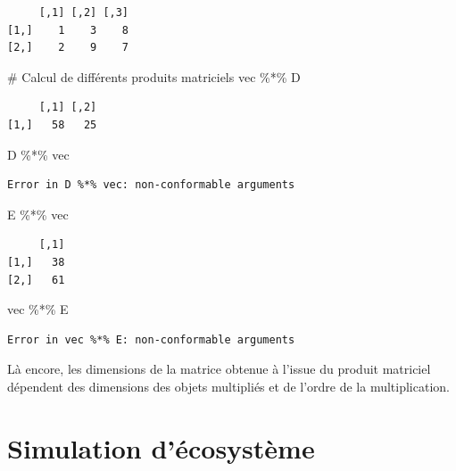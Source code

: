 \documentclass[
  french,
  a4paper,
  DIV=11,
  numbers=noendperiod,
  oneside]{scrreprt}
\newenvironment{Shaded}{}{}
\newcommand{\CommentTok}[1]{\textcolor[rgb]{0.42,0.45,0.49}{#1}}
\newcommand{\NormalTok}[1]{\textcolor[rgb]{0.14,0.16,0.18}{#1}}
\newcommand{\SpecialCharTok}[1]{\textcolor[rgb]{0.00,0.36,0.77}{#1}}
\begin{document}
\begin{tcolorbox}
\begin{verbatim}
     [,1] [,2] [,3]
[1,]    1    3    8
[2,]    2    9    7
\end{verbatim}

\begin{Shaded}
\begin{Highlighting}[]
\CommentTok{\# Calcul de différents produits matriciels}
\NormalTok{vec }\SpecialCharTok{\%*\%}\NormalTok{ D}
\end{Highlighting}
\end{Shaded}

\begin{verbatim}
     [,1] [,2]
[1,]   58   25
\end{verbatim}

\begin{Shaded}
\begin{Highlighting}[]
\NormalTok{D }\SpecialCharTok{\%*\%}\NormalTok{ vec}
\end{Highlighting}
\end{Shaded}

\begin{verbatim}
Error in D %*% vec: non-conformable arguments
\end{verbatim}

\begin{Shaded}
\begin{Highlighting}[]
\NormalTok{E }\SpecialCharTok{\%*\%}\NormalTok{ vec}
\end{Highlighting}
\end{Shaded}

\begin{verbatim}
     [,1]
[1,]   38
[2,]   61
\end{verbatim}

\begin{Shaded}
\begin{Highlighting}[]
\NormalTok{vec }\SpecialCharTok{\%*\%}\NormalTok{ E}
\end{Highlighting}
\end{Shaded}

\begin{verbatim}
Error in vec %*% E: non-conformable arguments
\end{verbatim}

Là encore, les dimensions de la matrice obtenue à l'issue du produit
matriciel dépendent des dimensions des objets multipliés et de l'ordre
de la multiplication.

\section{Simulation d'écosystème}\label{simulation-duxe9cosystuxe8me}


\end{tcolorbox}
\end{document}
